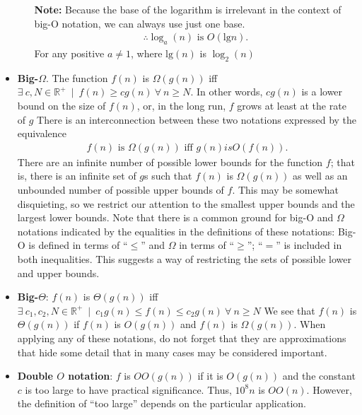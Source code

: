 \documentclass{report}
\begin{document}
\begin{itemize}
\begin{enumerate}
            \bigbreak \noindent 
            \textbf{Note:} Because the base of the logarithm is irrelevant in the context of big-O notation, we can always use just one base.
            \bigbreak \noindent 
            \begin{align*}
               \therefore \log_{a}{(n)} \text{ is } O(\text{lg}n)
            .\end{align*}
            For any positive $a\ne 1$, where $\text{lg}(n)$ is $\log_{2}{(n)}$
    \end{enumerate}
\item \textbf{Big-$\Omega$}. The function $f(n)$ is $\Omega(g(n))$ iff $\exists\ c,N \in \mathbb{R}^{+}\ \mid \ f(n) \geq cg(n) \ \forall \ n \geq N$.
    \bigbreak \noindent 
    In other words, $cg(n)$ is a lower bound on the size of $f(n)$, or, in the long run, $f$ grows at least at the rate of $g$
    \bigbreak \noindent 
    There is an interconnection between these two notations expressed by the equivalence
    \begin{align*}
        f(n) \text{ is } \Omega(g(n)) \text{ iff } g(n) is O(f(n))
    .\end{align*}
    \bigbreak \noindent 
    There are an infinite number of possible lower bounds for the function $f$; that is, there is an infinite set of $g$s such that $f(n)$ is $\Omega(g(n))$ as well as an unbounded number of possible upper bounds of $f$. This may be somewhat disquieting, so we restrict our attention to the smallest upper bounds and the largest lower bounds. Note that there is a common ground for big-O and $\Omega$ notations indicated by the equalities in the definitions of these notations: Big-O is defined in terms of ``$\leq$'' and $\Omega$ in terms of ``$\geq$''; ``$=$'' is included in both inequalities. This suggests a way of restricting the sets of possible lower and upper bounds. 
\item \textbf{Big-$\Theta$}: $f(n)$ is $\Theta(g(n))$ iff $\exists\ c_{1}, c_{2}, N \in \mathbb{R}^{+} \ \mid \ c_{1}g(n) \leq f(n) \leq c_{2}g(n) \ \forall \ n \geq N$
    \bigbreak \noindent 
    We see that $f(n)$ is $\Theta(g(n))$ if $f(n)$ is $O(g(n))$ and $f(n)$ is $\Omega(g(n))$.
    \bigbreak \noindent 
    When applying any of these notations, do not forget that they are approximations that hide some detail that in many cases may be considered important.
\item \textbf{Double $O$ notation}: $f$ is $OO(g(n))$ if it is $O(g(n))$ and the constant $c$ is too large to have practical significance. Thus, $10^{8}n$ is $OO(n)$. However, the definition of “too large” depends on the particular application.

\end{itemize}
\end{document}
